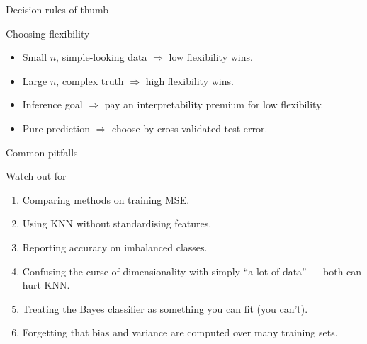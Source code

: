 \documentclass[aspectratio=169,11pt]{beamer}
\begin{document}
\begin{frame}{Decision rules of thumb}
  \begin{block}{Choosing flexibility}
    \begin{itemize}
      \item Small $n$, simple-looking data $\Rightarrow$ low
            flexibility wins.
      \item Large $n$, complex truth $\Rightarrow$ high flexibility
            wins.
      \item Inference goal $\Rightarrow$ pay an interpretability
            premium for low flexibility.
      \item Pure prediction $\Rightarrow$ choose by cross-validated
            test error.
    \end{itemize}
  \end{block}
\end{frame}

\begin{frame}{Common pitfalls}
  \begin{alertblock}{Watch out for}
    \begin{enumerate}
      \item Comparing methods on training MSE.
      \item Using KNN without standardising features.
      \item Reporting accuracy on imbalanced classes.
      \item Confusing the curse of dimensionality with simply ``a lot
            of data'' --- both can hurt KNN.
      \item Treating the Bayes classifier as something you can fit
            (you can't).
      \item Forgetting that bias and variance are computed over many
            training sets.
    \end{enumerate}
  \end{alertblock}
\end{frame}
\end{document}
